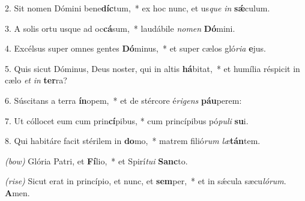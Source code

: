 2. Sit nomen Dómini bene\textbf{díc}tum,~*
	ex hoc nunc, et us\textit{que} \textit{in} \textbf{s\'{\ae}}culum.

3. A solis ortu usque ad oc\textbf{cá}sum,~*
	laudábile \textit{no}\textit{men} \textbf{Dó}mini.

4. Excélsus super omnes gentes \textbf{Dó}minus,~*
	et super cælos gló\textit{ri}\textit{a} \textbf{e}jus.

5. Quis sicut Dóminus, Deus noster, qui in altis \textbf{há}bitat,~*
	et humília réspicit in cælo \textit{et} \textit{in} \textbf{ter}ra?

6. Súscitans a terra \textbf{ín}opem,~*
	et de stércore é\textit{ri}\textit{gens} \textbf{páu}perem:

7. Ut cóllocet eum cum prin\textbf{cí}pibus, *
	cum princípibus pó\textit{pu}\textit{li} \textbf{su}i.

8. Qui habitáre facit stérilem in \textbf{do}mo,~*
	matrem filió\textit{rum} \textit{læ}\textbf{tán}tem.

\textit{(bow)} Glória Patri, et \textbf{Fí}lio,~*
	et Spirí\textit{tu}\textit{i} \textbf{Sanc}to.

\textit{(rise)} Sicut erat in princípio, et nunc, et \textbf{sem}per,~*
	et in s\'{\ae}cula sæcu\textit{ló}\textit{rum}. \textbf{A}men.